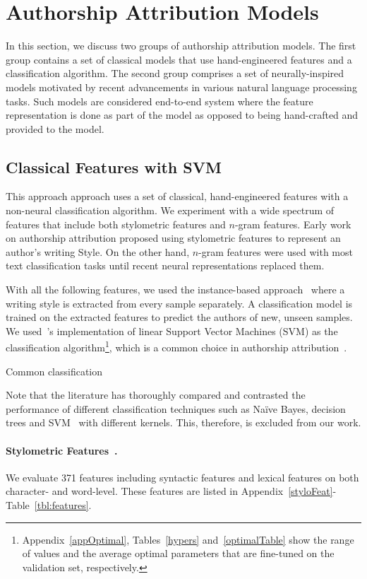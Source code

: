 \documentclass[11pt]{article}
\begin{document}
\section{Authorship Attribution Models\label{subsec:QWS}}
In this section, we discuss two groups of authorship attribution models. The first group contains a set of classical models that use hand-engineered features and a classification algorithm. The second group comprises a set of neurally-inspired models motivated by recent advancements in various natural language processing tasks. Such models are considered end-to-end system where the feature representation is done as part of the model as opposed to being hand-crafted and provided to the model. 


\subsection{Classical Features with SVM} 
This approach approach uses a set of classical, hand-engineered features with a non-neural classification algorithm. We experiment with a wide spectrum of features that include both stylometric features and $n$-gram features. Early work on authorship attribution proposed using stylometric features to represent an author's writing Style. On the other hand, $n$-gram features were used with most text classification tasks until recent neural representations replaced them.

With all the following features, we used the instance-based approach~\citep{Stamatatos.e:2009} where a writing style is extracted from every sample separately. A classification model is trained on the extracted features to predict the authors of new, unseen samples. We used~\citet{scikit-learn}'s implementation of linear Support Vector Machines (SVM) as the classification algorithm\footnote{Appendix~\ref{appOptimal}, Tables~\ref{hypers} and~\ref{optimalTable} show the range of values and the average optimal parameters that are fine-tuned on the validation set, respectively.}, which is a common choice in authorship attribution~\citep{Stamatatos.E:2017}. 

Common classification 

Note that the literature has thoroughly compared and contrasted the performance of different classification techniques such as Na\"ive Bayes, decision trees and SVM~\citep{Ding.S:2015, malik:2018} with different kernels. This, therefore, is excluded from our work.   

\paragraph{Stylometric Features~\citep{Iqbal.F:2008,Iqbal.F:2013}.}
We evaluate 371 features including syntactic features and lexical features on both character- and word-level. These features are listed in Appendix~\ref{styloFeat}-Table~\ref{tbl:features}.
\end{document}

